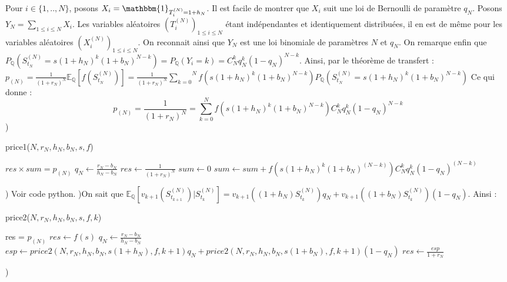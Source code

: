 \documentclass{exam}
\begin{document}
Pour $i \in \{1,..,N\}$, posons $X_i=\mathbbm{1}_{T_i^{(N)}=1+h_N}$. Il est facile de montrer que $X_i$ suit une loi de Bernoulli de paramètre $q_N$. Posons $Y_N=\underset{1 \leq i \leq N }{\sum}X_i$. Les variables aléatoires $(T_i^{(N)})_{1 \leq i \leq N}$ étant indépendantes et identiquement distribuées, il en est de même pour les variables aléatoires $(X_i^{(N)})_{1 \leq i \leq N}$. On reconnait ainsi que $Y_N$ est une loi binomiale de paramètres $N$ et $q_N$. On remarque enfin que $P_{\mathbb{Q}}(S_{t_N}^{(N)}=s(1+h_N)^k(1+b_N)^{N-k})=P_{\mathbb{Q}}(Y_i=k)=C_N^k q_N^k (1-q_N)^{N-k}$. Ainsi, par le théorème de transfert :
\newline
\espace
$p_{(N)}=\frac{1}{(1+r_N)^N}\mathbb{E}_{\mathbb{Q}}[f(S_{t_N}^{(N)})]=\frac{1}{(1+r_N)^N}\overset{N}{\underset{k=0}{\sum}}f(s(1+h_N)^k(1+b_N)^{N-k})P_{\mathbb{Q}}(S_{t_N}^{(N)}=s(1+h_N)^k(1+b_N)^{N-k})$
\newline
\espace
Ce qui donne :
$$\boxed{p_{(N)}=\frac{1}{(1+r_N)^N}=\overset{N}{\underset{k=0}{\sum}}f(s(1+h_N)^k(1+b_N)^{N-k})C_N^k q_N^k (1-q_N)^{N-k}}$$
\newline
{}) \begin{algorithm}
\caption{price1($N,r_N,h_N,b_N,s,f$)}
\begin{algorithmic}
\ENSURE $res \times sum = p_{(N)}$
\STATE $q_N \leftarrow \frac{r_N-b_N}{h_N-b_N}$
\STATE $res \leftarrow \frac{1}{(1+r_N)^N}$
\STATE $sum \leftarrow 0$
\STATE $sum \leftarrow sum + f(s(1+h_N)^k(1+b_N)^{(N-k)})C_N^kq_N^k(1-q_N)^{(N-k)}$
\ENDFOR
\end{algorithmic}
\end{algorithm}
\newline
{}) Voir code python.
\newline
{})On sait que $\mathbb{E}_\mathbb{Q}[v_{k+1}(S_{t_{k+1}}^{(N)})|S_{t_k}^{(N)}]=v_{k+1}((1+h_N)S_{t_k}^{(N)})q_N + v_{k+1}((1+b_N)S_{t_k}^{(N)})(1-q_N)$. Ainsi :
\begin{algorithm}
\caption{price2($N,r_N,h_N,b_N,s,f,k$)}
\begin{algorithmic}
\ENSURE res = $p_{(N)}$
\STATE $res \leftarrow f(s)$
\ELSE
\STATE $q_N \leftarrow \frac{r_N-b_N}{h_N-b_N}$
\STATE $esp \leftarrow price2(N,r_N,h_N,b_N,s(1+h_N),f,k+1)q_N + price2(N,r_N,h_N,b_N,s(1+b_N),f,k+1)(1-q_N)$
\STATE $res \leftarrow \frac{esp}{1+r_N}$
\ENDIF
\end{algorithmic}
\end{algorithm}
\newline
{})
\newline
\end{document}
